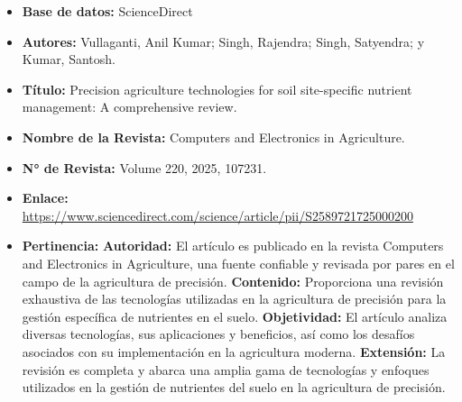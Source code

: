 \begin{itemize}
  \item \textbf{Base de datos:} ScienceDirect
  \item \textbf{Autores:} Vullaganti, Anil Kumar; Singh, Rajendra; Singh, Satyendra; y Kumar, Santosh.
  \item \textbf{Título:} Precision agriculture technologies for soil site-specific nutrient management: A comprehensive review.
  \item \textbf{Nombre de la Revista:} Computers and Electronics in Agriculture.
  \item \textbf{N° de Revista:} Volume 220, 2025, 107231.
  \item \textbf{Enlace:} \url{https://www.sciencedirect.com/science/article/pii/S2589721725000200}
  \item \textbf{Pertinencia:}
  \subitem \textbf{Autoridad:} El artículo es publicado en la revista Computers and Electronics in Agriculture, una fuente confiable y revisada por pares en el campo de la agricultura de precisión.
  \subitem \textbf{Contenido:} Proporciona una revisión exhaustiva de las tecnologías utilizadas en la agricultura de precisión para la gestión específica de nutrientes en el suelo.
  \subitem \textbf{Objetividad:} El artículo analiza diversas tecnologías, sus aplicaciones y beneficios, así como los desafíos asociados con su implementación en la agricultura moderna.
  \subitem \textbf{Extensión:} La revisión es completa y abarca una amplia gama de tecnologías y enfoques utilizados en la gestión de nutrientes del suelo en la agricultura de precisión.
\end{itemize}

